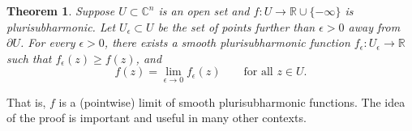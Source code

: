 \documentclass[12pt,openany]{book}
\newcommand{\C}{{\mathbb{C}}}
\newcommand{\R}{{\mathbb{R}}}
\theoremstyle{plain}
\newtheorem{thm}{Theorem}[section]
\theoremstyle{remark}
\theoremstyle{definition}
\theoremstyle{exercise}
\theoremstyle{example}
\begin{document}
\begin{thm} \label{thm:subharlim}
\pagebreak[2]%
Suppose $U \subset \C^n$ is an open set and $f \colon U \to \R \cup \{
-\infty \}$ is plurisubharmonic.
Let $U_\epsilon \subset U$
be the set of points further than $\epsilon > 0$ away from $\partial U$.
For every $\epsilon > 0$,
there exists a smooth plurisubharmonic function
$f_\epsilon \colon U_\epsilon \to \R$ such that $f_\epsilon(z) \geq
f(z)$, and
\begin{equation*}
f(z) = \lim_{\epsilon \to 0} f_\epsilon(z) \qquad \text{for all $z \in U$}.
\end{equation*}
\end{thm}

That is, $f$ is a (pointwise) limit of smooth plurisubharmonic functions.
The idea of the proof is important and useful in many other
contexts.
\end{document}

